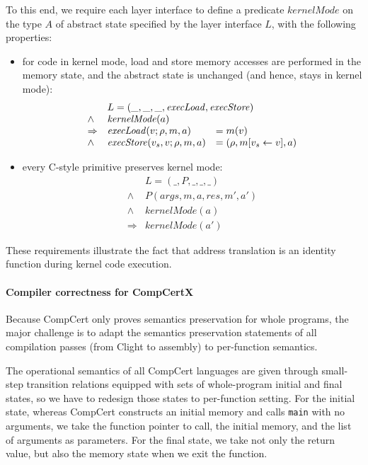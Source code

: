 To this end, we require each layer interface to define a predicate
$\mathit{kernelMode}$ on the type $A$ of abstract state specified by
the layer interface $L$, with the following properties:

\begin{itemize}
\item for code in kernel mode, load and store memory accesses are
  performed in the memory state, and the abstract state is unchanged
  (and hence, stays in kernel mode):
\[
\begin{array}{lll}
& \multicolumn{2}{l}{L = (\_, \_, \_, \mathit{execLoad}, \mathit{execStore})} \\
\land & {\mathit{kernelMode}(a)} \\
\Rightarrow & \mathit{execLoad}(v; \rho, m, a) & = m(v) \\
\land & \mathit{execStore}(v_s, v; \rho, m, a) & = (\rho, m[v_s \leftarrow v], a)
\end{array}
\]

\item every C-style primitive preserves kernel mode:
\[
\begin{array}{ll}
& L = (\_, P, \_, \_, \_) \\
\land & P(\mathit{args}, m, a, \mathit{res}, m', a') \\
\land & {\mathit{kernelMode}(a)} \\
\Rightarrow & {\mathit{kernelMode}(a')}
\end{array}
\]
\end{itemize}

These requirements illustrate the fact that address translation is an
identity function during kernel code execution.


\paragraph{Compiler correctness for CompCertX} 

Because CompCert only proves semantics preservation for whole
programs, the major challenge is to adapt the semantics preservation
statements of all compilation passes (from Clight to assembly) 
to per-function semantics.

The operational semantics of all CompCert languages are given through
small-step transition relations equipped with sets of whole-program
initial and final states, so we have to redesign those states to
per-function setting. For the initial state, whereas CompCert
constructs an initial memory and calls \verb+main+ with no arguments,
we take the function pointer to call, the initial memory, and the list
of arguments as parameters. For the final state, we take not
only the return value, but also the memory state when we exit the
function.

